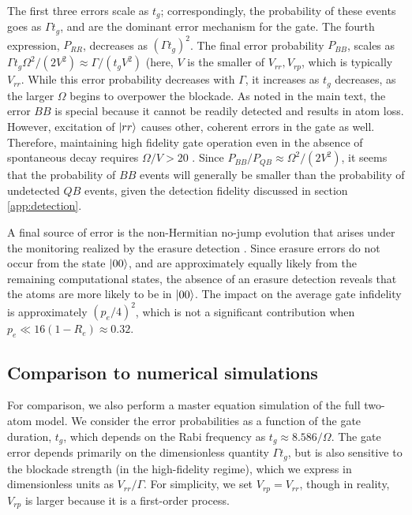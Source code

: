 \documentclass[%
reprint,
superscriptaddress,
 amsmath,amssymb,
 aps,
 prx,
floatfix,
]{revtex4-1}
\begin{document}
The first three errors scale as $t_g$; correspondingly, the probability of these events goes as $\Gamma t_g$, and are the dominant error mechanism for the gate. The fourth expression, $P_{RR}$, decreases as $(\Gamma t_g)^2$. The final error probability $P_{BB}$, scales as $\Gamma t_g \Omega^2/(2 V^2) \approx \Gamma / (t_g V^2)$ (here, $V$ is the smaller of $V_{rr},V_{rp}$, which is typically $V_{rr}$. While this error probability decreases with $\Gamma$, it increases as $t_g$ decreases, as the larger $\Omega$ begins to overpower the blockade. As noted in the main text, the error $BB$ is special because it cannot be readily detected and results in atom loss. However, excitation of $\ket{rr}$ causes other, coherent errors in the gate as well. Therefore, maintaining high fidelity gate operation even in the absence of spontaneous decay requires $\Omega/V > 20$ \cite{Levine2019}. Since $P_{BB}/P_{QB} \approx \Omega^2/(2 V^2)$, it seems that the probability of $BB$ events will generally be smaller than the probability of undetected $QB$ events, given the detection fidelity discussed in section \ref{app:detection}.

A final source of error is the non-Hermitian no-jump evolution that arises under the monitoring realized by the erasure detection \cite{plenio1998}. Since erasure errors do not occur from the state $\ket{00}$, and are approximately equally likely from the remaining computational states, the absence of an erasure detection reveals that the atoms are more likely to be in $\ket{00}$. The impact on the average gate infidelity is approximately $(p_e/4)^2$, which is not a significant contribution when $p_e \ll 16(1-R_e) \approx 0.32$.

\subsection{Comparison to numerical simulations}

For comparison, we also perform a master equation simulation of the full two-atom model. We consider the error probabilities as a function of the gate duration, $t_g$, which depends on the Rabi frequency as $t_g \approx 8.586/\Omega$. The gate error depends primarily on the dimensionless quantity $\Gamma t_g$, but is also sensitive to the blockade strength (in the high-fidelity regime), which we express in dimensionless units as $V_{rr}/\Gamma$. For simplicity, we set $V_{rp} = V_{rr}$, though in reality, $V_{rp}$ is larger because it is a first-order process.
\end{document}
